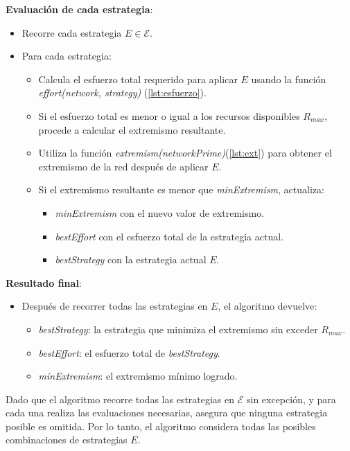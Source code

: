 \documentclass[letterpaper,10pt]{article}
\begin{document}
\textbf{Evaluación de cada estrategia}:
\begin{itemize}
    \item Recorre cada estrategia $E \in \mathcal{E}$.
    \item Para cada estrategia:
    \begin{itemize}
        \item Calcula el esfuerzo total requerido para aplicar $E$ usando la función \textit{effort(network, strategy)} (\ref{lst:esfuerzo}).
        \item Si el esfuerzo total es menor o igual a los recursos disponibles $R_{max}$, procede a calcular el extremismo resultante.
        \item Utiliza la función \textit{extremism(networkPrime)}(\ref{lst:ext}) para obtener el extremismo de la red después de aplicar $E$.
        \item Si el extremismo resultante es menor que \textit{minExtremism}, actualiza:
        \begin{itemize}
            \item \textit{minExtremism} con el nuevo valor de extremismo.
            \item \textit{bestEffort} con el esfuerzo total de la estrategia actual.
            \item \textit{bestStrategy} con la estrategia actual $E$.
        \end{itemize}
    \end{itemize}
\end{itemize}

\textbf{Resultado final}:
\begin{itemize}
    \item Después de recorrer todas las estrategias en $E$, el algoritmo devuelve:
    \begin{itemize}
        \item \textit{bestStrategy}: la estrategia que minimiza el extremismo sin exceder $R_{max}$.
        \item \textit{bestEffort}: el esfuerzo total de \textit{bestStrategy}.
        \item \textit{minExtremism}: el extremismo mínimo logrado.
    \end{itemize}
\end{itemize}

Dado que el algoritmo recorre todas las estrategias en $\mathcal{E}$ sin excepción, y para cada una realiza las evaluaciones necesarias, asegura que ninguna estrategia posible es omitida. Por lo tanto, el algoritmo considera todas las posibles combinaciones de estrategias $E$.
\end{document}
